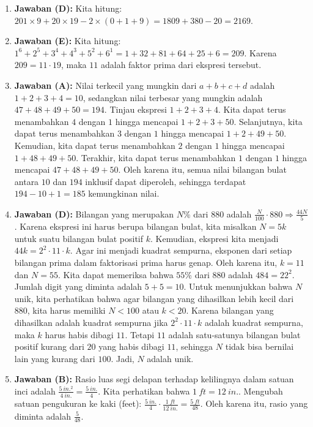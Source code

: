\documentclass{article}
\begin{document}
\begin{enumerate}
\item \textbf{Jawaban (D):} Kita hitung: $201\times9+20\times19-2\times(0+1+9)=1809+380-20=2169$.

\item \textbf{Jawaban (E):} Kita hitung: $1^{6}+2^{5}+3^{4}+4^{3}+5^{2}+6^{1}=1+32+81+64+25+6=209$. Karena $209=11\cdot19$, maka $11$ adalah faktor prima dari ekspresi tersebut.

\item \textbf{Jawaban (A):} Nilai terkecil yang mungkin dari $a+b+c+d$ adalah $1+2+3+4=10$, sedangkan nilai terbesar yang mungkin adalah $47+48+49+50=194$. Tinjau ekspresi $1+2+3+4$. Kita dapat terus menambahkan $4$ dengan $1$ hingga mencapai $1+2+3+50$. Selanjutnya, kita dapat terus menambahkan $3$ dengan $1$ hingga mencapai $1+2+49+50$. Kemudian, kita dapat terus menambahkan $2$ dengan $1$ hingga mencapai $1+48+49+50$. Terakhir, kita dapat terus menambahkan $1$ dengan $1$ hingga mencapai $47+48+49+50$. Oleh karena itu, semua nilai bilangan bulat antara $10$ dan $194$ inklusif dapat diperoleh, sehingga terdapat $194-10+1=185$ kemungkinan nilai.

\item \textbf{Jawaban (D):} Bilangan yang merupakan $N$\% dari $880$ adalah $\frac{N}{100}\cdot880\Rightarrow\frac{44N}{5}$. Karena ekspresi ini harus berupa bilangan bulat, kita misalkan $N=5k$ untuk suatu bilangan bulat positif $k$. Kemudian, ekspresi kita menjadi $44k=2^{2}\cdot11\cdot k$. Agar ini menjadi kuadrat sempurna, eksponen dari setiap bilangan prima dalam faktorisasi prima harus genap. Oleh karena itu, $k=11$ dan $N=55$. Kita dapat memeriksa bahwa $55$\% dari $880$ adalah $484=22^{2}$. Jumlah digit yang diminta adalah $5+5=10$. Untuk menunjukkan bahwa $N$ unik, kita perhatikan bahwa agar bilangan yang dihasilkan lebih kecil dari $880$, kita harus memiliki $N<100$ atau $k<20$. Karena bilangan yang dihasilkan adalah kuadrat sempurna jika $2^{2}\cdot11\cdot k$ adalah kuadrat sempurna, maka $k$ harus habis dibagi $11$. Tetapi $11$ adalah satu-satunya bilangan bulat positif kurang dari $20$ yang habis dibagi $11$, sehingga $N$ tidak bisa bernilai lain yang kurang dari $100$. Jadi, $N$ adalah unik.

\item \textbf{Jawaban (B):} Rasio luas segi delapan terhadap kelilingnya dalam satuan inci adalah $\frac{5~in.^{2}}{4~in.}=\frac{5~in.}{4}$. Kita perhatikan bahwa $1~ft=12~in.$. Mengubah satuan pengukuran ke kaki (feet): $\frac{5~in.}{4}\cdot\frac{1~ft}{12~in.}=\frac{5~ft}{48}$. Oleh karena itu, rasio yang diminta adalah $\frac{5}{48}$.


\end{enumerate}
\end{document}
